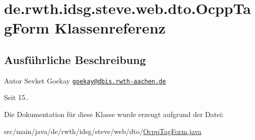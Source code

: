 \hypertarget{classde_1_1rwth_1_1idsg_1_1steve_1_1web_1_1dto_1_1_ocpp_tag_form}{\section{de.\-rwth.\-idsg.\-steve.\-web.\-dto.\-Ocpp\-Tag\-Form Klassenreferenz}
\label{classde_1_1rwth_1_1idsg_1_1steve_1_1web_1_1dto_1_1_ocpp_tag_form}
}


\subsection{Ausführliche Beschreibung}
\begin{DoxyAuthor}{Autor}
Sevket Goekay \href{mailto:goekay@dbis.rwth-aachen.de}{\tt goekay@dbis.\-rwth-\/aachen.\-de} 
\end{DoxyAuthor}
\begin{DoxySince}{Seit}
15.. 
\end{DoxySince}


Die Dokumentation für diese Klasse wurde erzeugt aufgrund der Datei\-:\begin{DoxyCompactItemize}
\item 
src/main/java/de/rwth/idsg/steve/web/dto/\hyperlink{_ocpp_tag_form_8java}{Ocpp\-Tag\-Form.\-java}\end{DoxyCompactItemize}
